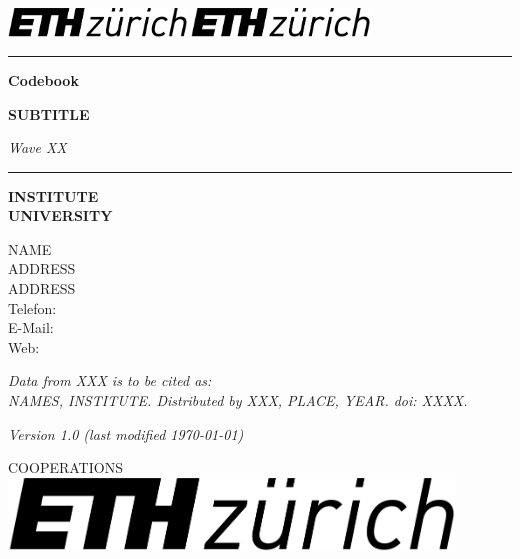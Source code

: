 \begin{titlepage}
	
	\setlength\parindent{0pt}
	\parskip=10pt
	
	\includegraphics[height=22pt]{img/logo1.png}
	\hspace*{6,5cm}\includegraphics[height=22pt]{img/logo2.png}
	
	\vspace*{\fill}
	\rule{15cm}{0.4pt}
	
	\Huge\textbf{Codebook}%
	
	\huge\textbf{SUBTITLE}%
	
	\huge\textit{Wave XX} %
	
	\rule{15cm}{0.4pt}
	\vspace*{\fill}
	
	\normalsize\textbf{INSTITUTE\\
		UNIVERSITY}
	
	NAME\\
	ADDRESS\\
	ADDRESS\\
	Telefon: \\
	E-Mail: \\
	Web: 
	
	\vspace{5mm}				
	
	\emph{Data from XXX is to be cited as: \\
		NAMES, INSTITUTE. Distributed by XXX, PLACE, YEAR. doi: XXXX.
	} \\

	
	
	\vspace{10mm}
	
	\emph{Version 1.0 (last modified \today)} %
	
	\vspace{20mm}
	
	\textsc{COOPERATIONS}
	\hspace*{1cm}\includegraphics[height=55pt]{img/logo3.png}
	
\end{titlepage}
